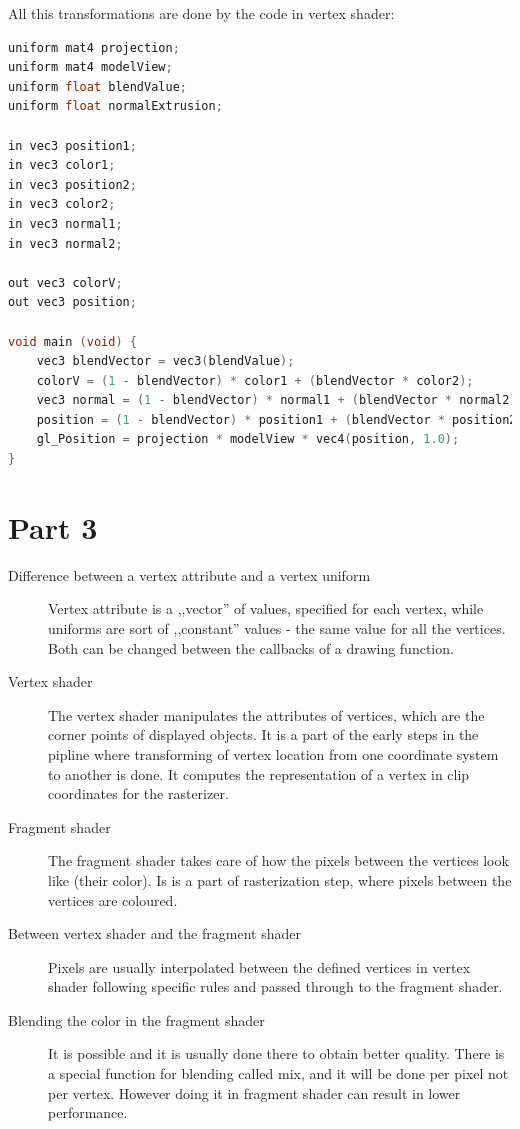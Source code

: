 All this transformations are done by the code in vertex shader:

\begin{lstlisting}[language=cpp, caption={Vertex blending}]
uniform mat4 projection;
uniform mat4 modelView;
uniform float blendValue;
uniform float normalExtrusion;

in vec3 position1;
in vec3 color1;
in vec3 position2;
in vec3 color2;
in vec3 normal1;
in vec3 normal2;

out vec3 colorV;
out vec3 position;

void main (void) {
	vec3 blendVector = vec3(blendValue);
    colorV = (1 - blendVector) * color1 + (blendVector * color2);
	vec3 normal = (1 - blendVector) * normal1 + (blendVector * normal2);
	position = (1 - blendVector) * position1 + (blendVector * position2) + (normal * normalExtrusion);
	gl_Position = projection * modelView * vec4(position, 1.0);
}
\end{lstlisting}
\clearpage

\section{Part 3}
\begin{description}
\item[Difference between a vertex attribute and a vertex uniform]
	Vertex attribute is a ,,vector'' of values, specified for each vertex, 
	while uniforms are sort of ,,constant'' values - the same value for all the vertices. 
	Both can be changed between the callbacks of a drawing function. 
\item[Vertex shader]
	The vertex shader manipulates the attributes of vertices, which are the corner points of displayed objects.
	It is a part of the early steps in the pipline where transforming of vertex location from one coordinate
	system to another is done. It computes the representation of a vertex in clip coordinates for the rasterizer.
\item[Fragment shader]
	The fragment shader takes care of how the pixels between the vertices look like (their color).
	Is is a part of rasterization step, where pixels between the vertices are coloured. 
\item[Between vertex shader and the fragment shader]
	Pixels are usually interpolated between the defined vertices in vertex shader following specific rules
	and passed through to the fragment shader.
\item[Blending the color in the fragment shader]
	It is possible and it is usually done there to obtain better quality. There is a special function for blending
	called mix, and it will be done per pixel not per vertex. However doing it in fragment shader can result in 
	lower performance.
\end{description}
\clearpage


